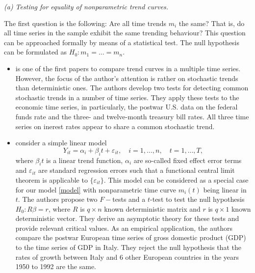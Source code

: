\documentclass[a4paper,12pt]{article}
\begin{document}
\noindent \textit{(a) Testing for equality of nonparametric trend curves. } 
\vspace{10pt} 

 
\noindent The first question is the following: Are all time trends $m_i$ the same? That is, do all time series in the sample exhibit the same trending behaviour? This question can be approached formally by means of a statistical test. The null hypothesis can be formulated as $H_0: m_1 = \ldots = m_n$. 
\begin{itemize}[label=--,leftmargin=0.5cm]
\item \cite{Stock1988} is one of the first papers to compare trend curves in a multiple time series. However, the focus of the author's attention is rather on stochastic trends than deterministic ones. The authors develop two tests for detecting common stochastic trends in a number of time series. They apply these tests to the economic time series, in particularly, the postwar U.S. data on the federal funds rate and the three- and twelve-month treasury bill rates. All three time series on inerest rates appear to share a common stochastic trend.

\item \cite{Vogelsang2005} consider a simple linear model
\begin{equation}\label{model-vogelsang}
Y_{it} =\alpha_i + \beta_i t + \varepsilon_{it}, \quad i=1, \ldots, n, \quad t=1, \ldots, T,
\end{equation}
where $\beta_i t$ is a linear trend function, $\alpha_i$ are so-called fixed effect error terms and $\varepsilon_{it}$ are standard regression errors such that a functional central limit theorem is applicable to $\{\varepsilon_{it}\}$. This model can be considered as a special case for our model \eqref{model} with nonparametric time curve $m_i(t)$ being linear in $t$. The authors propose two $F-$tests and a $t$-test to test the null hypothesis $H_0: R\beta = r$, where $R$ is $q \times n$ known deterministic matrix and $r$ is $q\times 1$ known deterministic vector. They derive an asymptotic theory for these tests and provide relevant critical values. As an empirical application, the authors compare the postwar European time series of gross domestic product (GDP) to the time series of GDP in Italy. They reject the null hypothesis that the rates of growth between Italy and 6 other European countries in the years 1950 to 1992 are the same.


\end{itemize}
\end{document}
